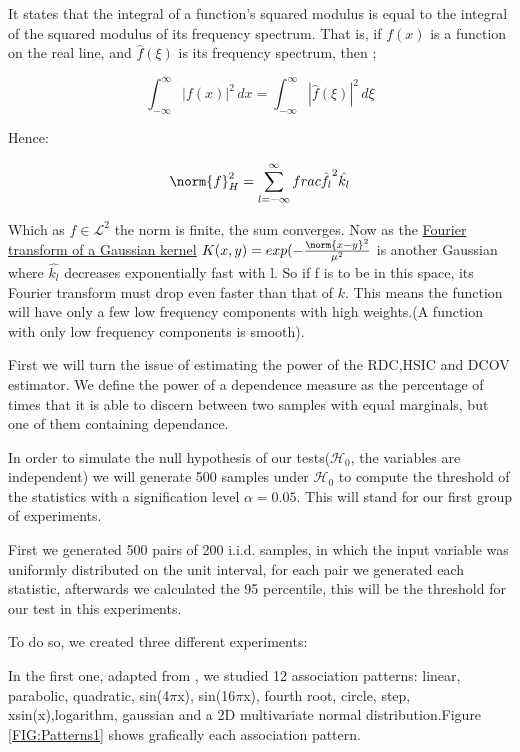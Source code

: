 It states that the integral of a function's squared modulus is equal to the integral of the squared modulus of its frequency spectrum. That is, if $f(x)$ is a function on the real line, and ${\widehat {f}}(\xi )$ is its frequency spectrum, then ; 

$$
\int _{-\infty }^{\infty }|f(x)|^{2}\,dx=\int _{-\infty }^{\infty }|{\widehat {f}}(\xi )|^{2}\,d\xi
$$

Hence:

$$
\norm{f}^{2}_{H}= \sum_{l=-\infty}^{\infty}frac{\hat{f_{l}}^{2}}{\hat{k_{l}}}
$$

Which as $f\in\mathcal{L}^{2}$ the norm is finite, the sum converges. Now as the  \href{http://mathworld.wolfram.com/FourierTransformGaussian.html}{Fourier transform of a Gaussian kernel}  $K(x,y) = exp(-\frac{\norm{x-y}^{2}}{\mu^{2}}$ is another Gaussian where $\hat{k_{l}}$ decreases exponentially fast with l. So if f is to be in this space, its Fourier transform must drop even faster than that of $k$. This means the function will have only a few low frequency components with high weights.(A function with only low frequency components is smooth). 

First we will turn the issue of estimating the power of the RDC,HSIC and DCOV estimator. We define the power of a dependence measure as the percentage of times that it is able to discern between two samples with equal marginals, but one of them containing dependance.

In order to simulate the null hypothesis of our tests($\mathcal{H}_{0}$, the variables are independent) we will generate 500 samples under $\mathcal{H}_{0}$ to compute the threshold of the statistics with a signification level $\alpha = 0.05$. This will stand for our first group of experiments.

First we generated 500 pairs  of 200 i.i.d. samples, in which the input variable was uniformly distributed on the unit interval, for each pair we generated each statistic, afterwards we calculated the 95 percentile, this will be the threshold for our test in this experiments.

To do so, we created three different experiments:

In the first one, adapted from \cite{RDC1}, we studied 12 association patterns: linear, parabolic, quadratic, sin(4$\pi$x), sin(16$\pi$x), fourth root, circle, step, xsin(x),logarithm, gaussian and a 2D multivariate normal distribution.Figure \ref{FIG:Patterns1} shows grafically each association pattern.

